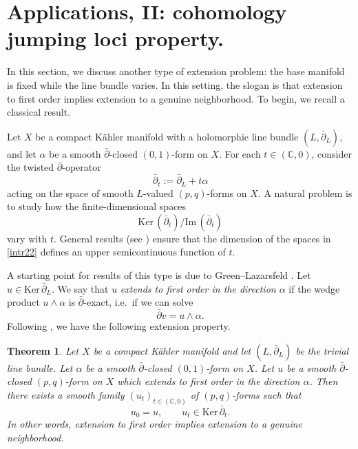 \documentclass[english]{amsart}
\newcommand{\CC}{\mathbb{C}}
\newcommand{\im}{\mathrm{Im} \,}
\renewcommand{\ker}{\mathrm{Ker} \,}
\newcommand{\dbar}{\bar \partial}
\newtheorem{thm}{Theorem}[section]
\numberwithin{equation}{thm}
\begin{document}
	
	
	
\section{Applications, II: cohomology jumping loci property. }\label{jumping}

In this section, we discuss another type of extension problem: the base manifold is fixed while the line bundle varies. In this setting, the slogan is that extension to first order implies extension to a genuine neighborhood. To begin, we recall a classical result.

Let $X$ be a compact K\"ahler manifold with a holomorphic line bundle $(L,\dbar_L)$, and let $\alpha$ be a smooth $\dbar$-closed $(0,1)$-form on $X$. For each $t \in (\CC,0)$, consider the twisted $\dbar$-operator
\begin{equation}\label{intr1}
	\dbar_t := \dbar_L + t\alpha
\end{equation}
acting on the space of smooth $L$-valued $(p,q)$-forms on $X$.
A natural problem is to study how the finite-dimensional spaces
\begin{equation}\label{intr22}
	\ker(\dbar_t)\big/\im(\dbar_t)
\end{equation}
vary with $t$. General results (see \cite{Kod86}) ensure that the dimension of the spaces in \eqref{intr22} defines an upper semicontinuous function of $t$.

A starting point for results of this type is due to Green--Lazarsfeld \cite{GL87,GL91}.
Let $u \in \ker \dbar_L$. We say that $u$ \emph{extends to first order in the direction $\alpha$} if the wedge product $u\wedge \alpha$ is $\dbar$-exact, i.e.\ if we can solve
\begin{equation}\label{intr3}
	\dbar v = u\wedge \alpha.
\end{equation}
Following \cite[\S 1]{GL87}, we have the following extension property.

\begin{thm}\label{extencla}
	Let $X$ be a compact K\"ahler manifold and let $(L,\dbar_L)$ be the trivial line bundle.
	Let $\alpha$ be a smooth $\dbar$-closed $(0,1)$-form on $X$.
	Let $u$ be a smooth $\dbar$-closed $(p,q)$-form on $X$ which extends to first order in the direction $\alpha$.
	Then there exists a smooth family $(u_t)_{t\in (\CC,0)}$ of $(p,q)$-forms such that
	\begin{equation}\label{intr4}
		u_0 = u, \qquad u_t \in \ker \dbar_t.
	\end{equation}
	In other words, extension to first order implies extension to a genuine neighborhood.
\end{thm}
\end{document}
